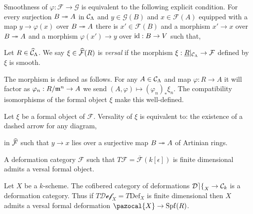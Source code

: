 \documentclass[12pt]{article}
\newcommand{\Def}{\mathrm{Def}}
\newcommand{\cDef}{\mathcal{Def}}
\renewcommand{\X}{\pazocal{X}}
\newcommand{\Spf}[1]{\mathrm{Spf} \! \left(#1 \right)}
\renewcommand{\F}{\mathcal{F}}
\renewcommand{\G}{\mathcal{G}}
\begin{document}
\begin{lemma}
Smoothness of $\varphi : \F \to \G$ is equivalent to the following explicit condition. For every surjection $B \twoheadrightarrow A$ in $\mathcal{C}_{\Lambda}$ and $y \in \G(B)$ and $x \in \F(A)$ equipped with a map $y \to \varphi(x)$ over $B \twoheadrightarrow A$ there is $x' \in \F(B)$ and a morphism $x' \to x$ over $B \twoheadrightarrow A$ and a morphism $\varphi(x') \to y$ over $\mathrm{id} : B \to V$ such that,
\begin{center}
\end{center}
\end{lemma}

\begin{defn}
Let $R \in \widehat{\mathcal{C}}_{\Lambda}$. We say $\xi \in \wh{\F}(R)$ is \textit{versal} if the morphism $\xi : \underline{R}|_{\C_\Lambda} \to \F$ defined by $\xi$ is smooth.
\end{defn}

\begin{rmk}
The morphism is defined as follows. For any $A \in \mathcal{C}_{\Lambda}$ and map $\varphi : R \to A$ it will factor as $\varphi_n : R / \mathfrak{m}^n \to A$ we send $(A, \varphi) \mapsto (\varphi_n)_* \xi_n$. The compatibility isomorphisms of the formal object $\xi$ make this well-defined. 
\end{rmk}

\begin{rmk}
Let $\xi$ be a formal object of $\F$. Versality of $\xi$ is equivalent to: the existence of a dashed arrow for any diagram,
\begin{center}
\end{center}
in $\wh{\F}$ such that $y \to x$ lies over a surjective map $B \twoheadrightarrow A$ of Artinian rings. 
\end{rmk}

\begin{theorem}
A deformation category $\F$ such that $T \F = \overline{\F}(k[\epsilon])$ is finite dimensional admits a versal formal object.
\end{theorem}

\begin{example}
Let $X$ be a $k$-scheme. The cofibered category of deformations $\cDef_X \to \C_{k}$ is a deformation category. Thus if $T \cDef_X = T \Def_X$ is finite dimensional then $X$ admits a versal formal deformation $\X \to \Spf{R}$.
\end{example}
\end{document}

